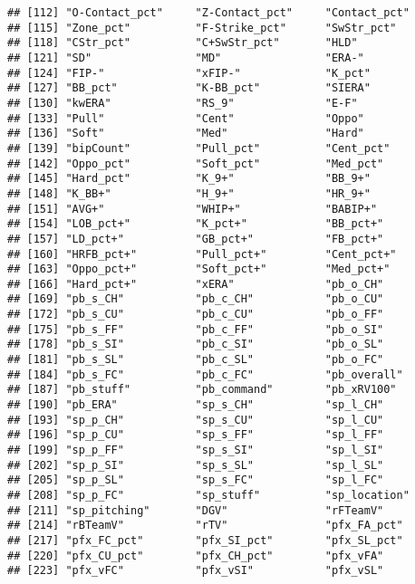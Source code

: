 \documentclass[
]{article}
\begin{document}
\begin{verbatim}
## [112] "O-Contact_pct"     "Z-Contact_pct"     "Contact_pct"      
## [115] "Zone_pct"          "F-Strike_pct"      "SwStr_pct"        
## [118] "CStr_pct"          "C+SwStr_pct"       "HLD"              
## [121] "SD"                "MD"                "ERA-"             
## [124] "FIP-"              "xFIP-"             "K_pct"            
## [127] "BB_pct"            "K-BB_pct"          "SIERA"            
## [130] "kwERA"             "RS_9"              "E-F"              
## [133] "Pull"              "Cent"              "Oppo"             
## [136] "Soft"              "Med"               "Hard"             
## [139] "bipCount"          "Pull_pct"          "Cent_pct"         
## [142] "Oppo_pct"          "Soft_pct"          "Med_pct"          
## [145] "Hard_pct"          "K_9+"              "BB_9+"            
## [148] "K_BB+"             "H_9+"              "HR_9+"            
## [151] "AVG+"              "WHIP+"             "BABIP+"           
## [154] "LOB_pct+"          "K_pct+"            "BB_pct+"          
## [157] "LD_pct+"           "GB_pct+"           "FB_pct+"          
## [160] "HRFB_pct+"         "Pull_pct+"         "Cent_pct+"        
## [163] "Oppo_pct+"         "Soft_pct+"         "Med_pct+"         
## [166] "Hard_pct+"         "xERA"              "pb_o_CH"          
## [169] "pb_s_CH"           "pb_c_CH"           "pb_o_CU"          
## [172] "pb_s_CU"           "pb_c_CU"           "pb_o_FF"          
## [175] "pb_s_FF"           "pb_c_FF"           "pb_o_SI"          
## [178] "pb_s_SI"           "pb_c_SI"           "pb_o_SL"          
## [181] "pb_s_SL"           "pb_c_SL"           "pb_o_FC"          
## [184] "pb_s_FC"           "pb_c_FC"           "pb_overall"       
## [187] "pb_stuff"          "pb_command"        "pb_xRV100"        
## [190] "pb_ERA"            "sp_s_CH"           "sp_l_CH"          
## [193] "sp_p_CH"           "sp_s_CU"           "sp_l_CU"          
## [196] "sp_p_CU"           "sp_s_FF"           "sp_l_FF"          
## [199] "sp_p_FF"           "sp_s_SI"           "sp_l_SI"          
## [202] "sp_p_SI"           "sp_s_SL"           "sp_l_SL"          
## [205] "sp_p_SL"           "sp_s_FC"           "sp_l_FC"          
## [208] "sp_p_FC"           "sp_stuff"          "sp_location"      
## [211] "sp_pitching"       "DGV"               "rFTeamV"          
## [214] "rBTeamV"           "rTV"               "pfx_FA_pct"       
## [217] "pfx_FC_pct"        "pfx_SI_pct"        "pfx_SL_pct"       
## [220] "pfx_CU_pct"        "pfx_CH_pct"        "pfx_vFA"          
## [223] "pfx_vFC"           "pfx_vSI"           "pfx_vSL"          

\end{verbatim}
\end{document}
